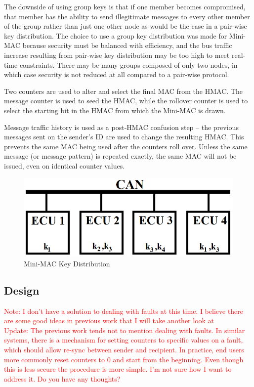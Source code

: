 The downside of using group keys is that if one member becomes compromised, that member has the ability to send illegitimate messages to every other member of the group rather than just one other node as would be the case in a pair-wise key distribution. The choice to use a group key distribution was made for Mini-MAC because security must be balanced with efficiency, and the bus traffic increase resulting from pair-wise key distribution may be too high to meet real-time constraints. There may be many groups composed of only two nodes, in which case security is not reduced at all compared to a pair-wise protocol.

Two counters are used to alter and select the final MAC from the HMAC. The message counter is used to seed the HMAC, while the rollover counter is used to select the starting bit in the HMAC from which the Mini-MAC is drawn.

Message traffic history is used as a post-HMAC confusion step -- the previous messages sent on the sender's ID are used to change the resulting HMAC. This prevents the same MAC being used after the counters roll over. Unless the same message (or message pattern) is repeated exactly, the same MAC will not be issued, even on identical counter values.
	
	\begin{figure}
		\centering
		\includegraphics[width=\columnwidth]{figures/key_distribution.png}
		\caption{Mini-MAC Key Distribution}
	\end{figure}
	
	
\subsection{Design}
\textcolor{red}{Note: I don't have a solution to dealing with faults at this time. I believe there are some good ideas in previous work that I will take another look at\\Update: The previous work tends not to mention dealing with faults. In similar systems, there is a mechanism for setting counters to specific values on a fault, which should allow re-sync between sender and recipient. In practice, end users more commonly reset counters to 0 and start from the beginning. Even though this is less secure the procedure is more simple. I'm not sure how I want to address it. Do you have any thoughts?}

